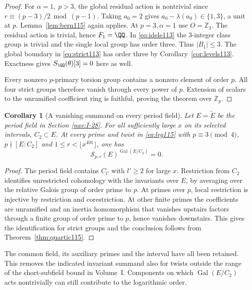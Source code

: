 \documentclass[a4paper,11pt]{article}
\newtheorem{corollary}[proposition]{Corollary}
\theoremstyle{definition}
\theoremstyle{remark}
\newcommand{\ZZ}{\mathbb Z}\newcommand{\ord}{\operatorname{ord}}
\numberwithin{equation}{section}
\begin{document}
\begin{proof}
For \(\alpha=1,\ p>3\), the global residual action is
nontrivial since \(r\equiv(p-3)/2\bmod (p-1)\). Taking \(a_0=2\)
gives \(a_0-\lambda(a_0)\in\{1,3\}\), a unit at \(p\).
Lemma~\ref{lem:bern115} again applies. At \(p=3,\alpha=1\)
use \(O=\ZZ_3\). The residual action is trivial, hence \(F_1=\QQ\).
In \eqref{eq:idele113} the \(3\)-integer class group is trivial
and the single local group has order three. Thus \(|B_1|\le3\).
The global boundary in \eqref{eq:strict113} has order three by
Corollary~\ref{cor:levels113}. Exactness gives \(S_\QQ(\theta)[3]=0\)
here as well.

Every nonzero \(p\)-primary torsion group contains a nonzero
element of order \(p\). All four strict groups therefore vanish
through every power of \(p\). Extension of scalars to the
unramified coefficient ring is faithful, proving the theorem
over \(\ZZ_p\).
\end{proof}

\begin{corollary}[A vanishing summand on every period field]
\label{cor:quarticperiod115}
Let \(E=\widetilde E\) be the period field in
Section \ref{nav:I-28}.
For all sufficiently large \(x\) on its selected intervals,
\(C_2\subset E\). At every prime and twist in
\eqref{eq:leg115} with \(p\equiv3\pmod4\),
\(p\nmid[E:C_2]\) and \(1\le r<\lfloor x^{401}\rfloor\),
one has
\[
       \mathcal S_{p,r}(E)^{\operatorname{Gal}(E/C_2)}=0 .
\]
\end{corollary}
\begin{proof}
The period field contains \(C_{l'}\) with \(l'\ge2\) for large
\(x\). Restriction from \(C_2\) identifies unrestricted
cohomology with the invariants over \(E\), by averaging over
the relative Galois group of order prime to \(p\).
At primes over \(p\), local restriction is injective by
restriction and corestriction. At other finite primes the
coefficients are unramified and an inertia homomorphism that
vanishes upstairs factors through a finite group of order
prime to \(p\), hence vanishes downstairs. This gives the
identification for strict groups and the conclusion follows
from Theorem~\ref{thm:quartic115}.
\end{proof}

The common field, its auxiliary primes and the interval have
all been retained. This removes the indicated invariant summand
also for twists outside the range of the short-subfield bound
in Volume~I. Components on which \(\operatorname{Gal}(E/C_2)\)
acts nontrivially can still contribute to the logarithmic order.
\end{document}
